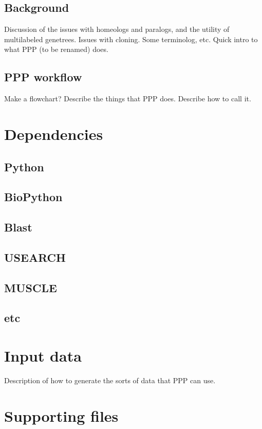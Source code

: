 \documentclass[12pt,letterpaper]{article}
\begin{document}
\subsection{Background} 
Discussion of the issues with homeologs and paralogs, and the utility of 
multilabeled genetrees. Issues with cloning. Some terminolog, etc.
Quick intro to what PPP (to be renamed) does.

\subsection{PPP workflow}
Make a flowchart? Describe the things that PPP does.
Describe how to call it.

\bigskip\section{Dependencies} %
\subsection{Python}

\subsection{BioPython}

\subsection{Blast}

\subsection{USEARCH}

\subsection{MUSCLE}

\subsection{etc}

\bigskip\section{Input data}
Description of how to generate the sorts of data that PPP can use.

\bigskip\section{Supporting files}
\end{document}
